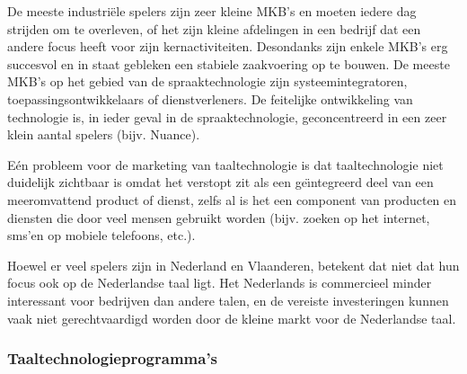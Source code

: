 \documentclass[]{../../metanetpaper}
\begin{document}
\begin{multicols}{2}
    De meeste industri{\"e}le spelers zijn zeer kleine MKB's en moeten iedere dag strijden om te overleven, of het zijn kleine afdelingen in een bedrijf dat een andere focus heeft voor zijn kernactiviteiten. Desondanks zijn enkele MKB's erg succesvol en in staat gebleken een stabiele zaakvoering op te bouwen. De meeste MKB's op het gebied van de spraaktechnologie zijn systeemintegratoren, toepassingsontwikkelaars of dienstverleners. De feitelijke ontwikkeling van technologie is, in ieder geval in de spraaktechnologie, geconcentreerd in een zeer klein aantal spelers (bijv. Nuance).

    E{\'e}n probleem voor de marketing van taaltechnologie is dat taaltechnologie niet duidelijk zichtbaar is omdat het verstopt zit als een ge{\"\i}ntegreerd deel van een meeromvattend product of dienst, zelfs al is het een component van producten en diensten die door veel mensen gebruikt worden (bijv. zoeken op het internet, sms'en op mobiele telefoons, etc.).

    Hoewel er veel spelers zijn in Nederland en Vlaanderen, betekent dat niet dat hun focus ook op de Nederlandse taal ligt. Het Nederlands is commercieel minder interessant voor bedrijven dan andere talen, en de vereiste investeringen kunnen vaak niet gerechtvaardigd worden door de kleine markt voor de Nederlandse taal.

\subsubsection{Taaltechnologieprogramma's}


\end{multicols}
\end{document}
